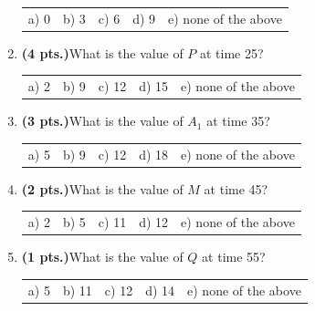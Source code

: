 \documentclass{article}
\begin{document}
\begin{enumerate}
\begin{tabular}{p{0.6in} p{0.6in} p{0.6in} p{0.6in} l}
a) 0 & b) 3 & c) 6 & d) 9 & e) none of the above
\end{tabular}

\item {\bf (4 pts.)}What is the value of $P$ at time 25?

\begin{tabular}{p{0.6in} p{0.6in} p{0.6in} p{0.6in} l}
a) 2 & b) 9 & c) 12 & d) 15 & e) none of the above
\end{tabular}

\item {\bf (3 pts.)}What is the value of $A_1$ at time 35?

\begin{tabular}{p{0.6in} p{0.6in} p{0.6in} p{0.6in} l}
a) 5 & b) 9 & c) 12 & d) 18 & e) none of the above
\end{tabular}

\item {\bf (2 pts.)}What is the value of $M$ at time 45?

\begin{tabular}{p{0.6in} p{0.6in} p{0.6in} p{0.6in} l}
a) 2 & b) 5 & c) 11 & d) 12 & e) none of the above
\end{tabular}

\item {\bf (1 pts.)}What is the value of $Q$ at time 55?

\begin{tabular}{p{0.6in} p{0.6in} p{0.6in} p{0.6in} l}
a) 5 & b) 11 & c) 12 & d) 14 & e) none of the above
\end{tabular}
\end{enumerate}
\end{document}
